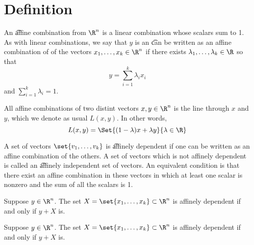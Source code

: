 
\section*{Definition}

An \t{affine combination} from $\R ^n$ is a linear combination whose scalars sum to 1.
As with linear combinations, we say that $y$ is an \t{can be written as an affine combination of} of the vectors $x_1, \dots , x_k \in \R ^n$ if there exists $\lambda _1, \dots , \lambda _k \in \R $ so that
\[
y = \sum_{i =1 }^{k} \lambda _i x_i
\]
and $\sum_{i = 1}^{k} \lambda _i = 1$.

All affine combinations of two distint vectors $x, y \in \R ^n$ is the line through $x$ and $y$, which we denote as usual $L(x, y)$.
In other words,
\[
L(x, y) = \Set{(1-\lambda )x + \lambda y}{\lambda  \in \R }
\]

A set of vectors $\set{v_1, \dots , v_k}$ is \t{affinely dependent} if one can be written as an affine combination of the others.
A set of vectors which is not affinely dependent is called an \t{affinely independent set of vectors}.
An equivalent condition is that there exist an affine combination in these vectors in which at least one scalar is nonzero and the sum of all the scalars is 1.

\begin{proposition}
Suppose $y \in \R ^n$.
The set $X = \set{x_1, \dots , x_k} \subset \R ^n$ is affinely dependent if and only if $y + X$ is.
\end{proposition}

\begin{proposition}
Suppose $y \in \R ^n$.
The set $X = \set{x_1, \dots , x_k} \subset \R ^n$ is affinely dependent if and only if $y + X$ is.

\end{proposition}

\blankpage